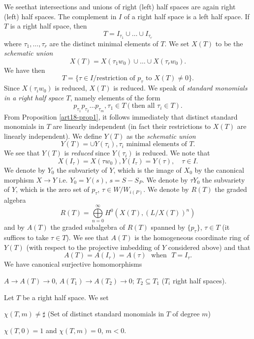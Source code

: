 We see\pageoriginale that intersections and unions of right (\resp left) half spaces are again right (\resp left) half spaces. The complement in $I$ of a right half space is a left half space. If $T$ is a right half space, then
$$
T = I_{\tau_1} \cup \ldots \cup I_{\tau_r}
$$
where $\tau_1, \ldots, \tau_r$ are the distinct minimal elements of $T$. We set $X(T)$ to be the {\em schematic union}
$$
X (T) = X (\tau_1 w_0) \cup \ldots \cup X ( \tau_r w_0).
$$
We have then 
$$
T = \{\tau \in I/ \text{restriction of } p_\tau \text{ to } X (T) \neq 0\}.
$$
Since $X(\tau_i w_0)$ is reduced, $X(T)$ is reduced. We speak of {\em standard monomials in a right half space $T$}, namely elements of the form 
$$
p_{\tau_1} p_{\tau_2} \ldots p_{\tau_m}, \tau_1 \in T (\text{then all } \tau_i \in T).
$$
From Proposition \ref{art18-prop1}, it follows immediately that distinct standard monomials in $T$ are linearly independent (in fact their restrictions to $X(T)$ are linearly independent). We define $Y(T)$ as the {\em schematic union}
$$
Y(T) = \cup Y (\tau_i), \tau_i \text{ minimal elements of $T$}.
$$
We see that $Y(T)$ is \textit{reduced} since $Y(\tau_i)$ is reduced. We note that 
$$
X(I_\tau) = X (\tau w_0), Y (I_\tau) = Y(\tau), \quad \tau \in I.
$$
We denote by $Y_0$ the subvariety of $Y$, which is the image of $X_0$ by the canonical morphism $X \to Y$ i.e. $Y_0 = Y(s)$, $s = S - S_P$. We denote by $\tau Y_0$ the subvariety of $Y$, which is the zero set of $p_\tau$, $\tau \in W / W_{i(P)}$. We denote by $R(T)$ the graded algebra
$$
R(T) =\bigoplus\limits^{\infty}_{n=0} H^0 (X(T), (L/ X (T))^n)
$$
and by $A(T)$ the graded subalgebra of $R(T)$ spanned by $\{p_\tau\}$, $\tau \in T$ (it suffices to take $\tau \in T$). We see that $A(T)$ is the homogeneous coordinate ring of $Y(T)$ (with respect to the projective imbedding of $Y$ considered above) and that 
$$
A (T) = A(I_\tau) = A(\tau) \text{~ when ~} T = I_\tau.
$$
We have canonical surjective homomorphisms 

$A \to A(T) \to 0$, \pageoriginale $A(T_1) \to A (T_2) \to 0$; $T_2 \subseteq T_1$ ($T_i$ right half spaces).

\begin{definition}\label{art18-defi4}
Let $T$ be a right half space. We set 

$\chi (T, m) \neq \sharp $ (Set of distinct standard monomials in $T$ of degree $m$)

$\chi(T,0) =1$ and $\chi(T, m) =0$, $m < 0$.
\end{definition}

